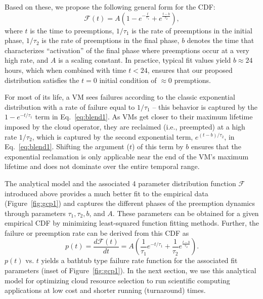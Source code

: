 Based on these, we propose the following general form for the CDF:
\begin{equation}
  \label{eq:blend1}
  \mathscr{F}\left(t\right) = A\left(1-e^{-\frac{t}{\tau_1}} + e^{\frac{t-b}{\tau_2}}\right),
\end{equation}
where $t$ is the time to preemptions, $1/\tau_1$ is the rate of preemptions in the initial phase, $1/\tau_2$ is the rate of preemptions in the final phase, $b$ denotes the time that characterizes ``activation'' of the final phase where preemptions occur at a very high rate, and $A$ is a scaling constant. In practice, typical fit values yield $b \approx 24$ hours, which when combined with time $t < 24$, ensures that our proposed distribution satisfies the $t=0$ initial condition of $\approx 0$ premptions.

For most of its life, a VM sees failures according to the classic exponential distribution with a rate of failure equal to $1/\tau_1$ -- this behavior is captured by the $1-e^{-t/\tau_1}$ term in Eq.~\ref{eq:blend1}. 
As VMs get closer to their maximum lifetime imposed by the cloud operator, they are reclaimed (i.e., preempted) at a high rate $1/\tau_2$, which is captured by the second exponential term, $e^{(t-b)/\tau_2}$, in Eq.~\ref{eq:blend1}. 
Shifting the argument ($t$) of this term by $b$ ensures that the exponential reclamation is only applicable near the end of the VM's maximum lifetime and does not dominate over the entire temporal range. 

The analytical model and the associated 4 parameter distribution function $\mathscr{F}$ introduced above provides a much better fit to the empirical data (Figure~\ref{fig:gcp1}) and captures the different phases of the preemption dynamics through parameters $\tau_1, \tau_2, b$, and $A$. These parameters can be obtained for a given empirical CDF by minimizing least-squared function fitting methods.\footnotemark 
%
%
Further, the failure or preemption rate can be derived from this CDF as 
\begin{equation}
\label{eq:failrate}
p(t) = \dfrac{d \mathscr{F}(t)} {dt} = A \left(\dfrac{1}{\tau_1}e^{-t/\tau_1} + \dfrac{1}{\tau_2}e^{\frac{t-b}{\tau_2}}\right).
\end{equation}
$p(t)$ vs. $t$ yields a bathtub type failure rate function for the associated fit parameters (inset of Figure~\ref{fig:gcp1}).
In the next section, we use this analytical model for optimizing cloud resource selection to run scientific computing applications at low cost and shorter running (turnaround) times.

